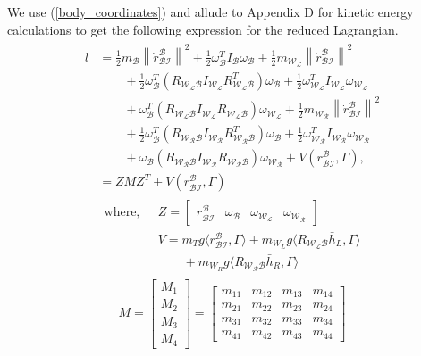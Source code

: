 \documentclass[letterpaper, 10 pt, conference]{ieeeconf}  \newcommand{\RN}[1]{\textup{\uppercase\expandafter{\romannumeral#1}}}
\newcommand{\norm}[1]{\left\lVert{#1}\right\rVert}
\begin{document}
We use (\ref{body_coordinates}) and allude to Appendix D for kinetic energy calculations to get the following expression for the reduced Lagrangian.
\begin{align}\label{red_lag}
\begin{split}
l & =\frac{1}{2}m_{\mathcal{B}}\norm{\dot{r}_{\mathcal{BI}}^{\mathcal{B}}}^2+\frac{1}{2}\omega_{\mathcal{B}}^{T} I_{\mathcal{B}} \omega_{\mathcal{B}} + \frac{1}{2}m_{\mathcal{W_L}}\norm{\dot{r}_{\mathcal{BI}}^{\mathcal{B}}}^2\\
& \quad \quad + \frac{1}{2}\omega_{\mathcal{B}}^{T}(R_\mathcal{W_LB}I_{\mathcal{W_L}}R_\mathcal{W_LB}^T)\omega_{\mathcal{B}} + \frac{1}{2}\omega_{\mathcal{W_L}}^{T}I_{\mathcal{W_L}}\omega_{\mathcal{W_L}} \\
& \quad \quad + \omega_{\mathcal{B}}^{T} (R_\mathcal{W_LB}I_{\mathcal{W_L}} R_\mathcal{W_LB}) \omega_{\mathcal{W_L}} + \frac{1}{2}m_{\mathcal{W_R}}\norm{\dot{r}_{\mathcal{BI}}^{\mathcal{B}}}^2 \\
&\quad \quad +\frac{1}{2}\omega_{\mathcal{B}}^T(R_\mathcal{W_RB}I_{\mathcal{W_R}}R_\mathcal{W_RB}^T)\omega_{\mathcal{B}} + \frac{1}{2}\omega_{\mathcal{W_R}}^{T}I_{\mathcal{W_R}}\omega_{\mathcal{W_R}} \\
& \quad \quad + \omega_{\mathcal{B}} (R_\mathcal{W_RB}I_{\mathcal{W_R}} R_\mathcal{W_RB}) \omega_{\mathcal{W_R}} + V( r_{\mathcal{BI}}^{\mathcal{B}},\Gamma), \\
&= Z M Z^T + V( r_{\mathcal{BI}}^{\mathcal{B}},\Gamma)
\end{split}
\end{align}
\begin{align*}
\text{where,}\:\:\: & Z=\begin{bmatrix}
r_{\mathcal{BI}}^{\mathcal{B}} & \omega_{\mathcal{B}} & \omega_{\mathcal{W_L}} & \omega_{\mathcal{W_R}}
\end{bmatrix} \\
& V = m_{T}g \langle r_{\mathcal{BI}}^{\mathcal{B}}, \Gamma \rangle + m_{W_L}g \langle R_{\mathcal{W_LB}} \bar{h}_L ,\Gamma \rangle \\
& \quad \quad + m_{W_R}g \langle R_{\mathcal{W_RB}} \bar{h}_R ,\Gamma \rangle
\end{align*}
\begin{align}\nonumber
\begin{split}
M =\begin{bmatrix}
M_{1}\\
M_{2}\\
M_{3}\\
M_{4}
\end{bmatrix}=\begin{bmatrix}
m_{11} & m_{12} & m_{13} & m_{14} \\
m_{21} & m_{22} & m_{23} & m_{24} \\
m_{31} & m_{32} & m_{33} & m_{34} \\
m_{41} & m_{42} & m_{43} & m_{44} 
\end{bmatrix}
\end{split}
\end{align}
\end{document}
